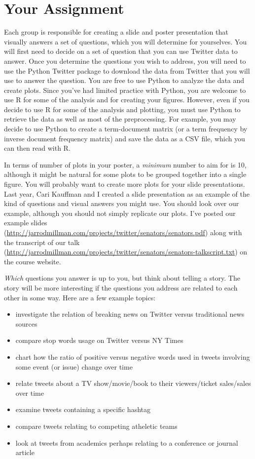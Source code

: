 \documentclass[11pt, oneside]{article}   	%
\begin{document}
\section{Your Assignment}

Each group is responsible for creating a slide and poster presentation that
visually answers a set of questions, which you will determine for yourselves.
You will first need to decide on a set of question that you can use Twitter
data to answer.  Once you determine the questions you wish to address, you will
need to use the Python Twitter package to download the data from Twitter that
you will use to answer the question.  You are free to use Python to analyze the
data and create plots.  Since you've had limited practice with Python, you are
welcome to use R for some of the analysis and for creating your figures.
However, even if you decide to use R for some of the analysis and plotting, you
must use Python to retrieve the data as well as most of the preprocessing.  For
example, you may decide to use Python to create a term-document matrix (or a
term frequency by inverse document frequency matrix) and save the data as a CSV
file, which you can then read with R.

In terms of number of plots in your poster, a {\em minimum} number to aim for
is 10, although it might be natural for some plots to be grouped together into
a single figure.  You will probably want to create more plots for your slide
presentations.  Last year, Cari Kauffman and I created a slide presentation as
an example of the kind of questions and visual answers you might use.  You
should look over our example, although you should not simply replicate our
plots.  I've posted our example slides
(\url{http://jarrodmillman.com/projects/twitter/senators/senators.pdf}) along
with the transcript of our talk
(\url{http://jarrodmillman.com/projects/twitter/senators/senators-talkscript.txt})
on the course website.

{\em Which} questions you answer is up to you, but think about telling a story.
The story will be more interesting if the questions you address are related to
each other in some way.  Here are a few example topics:

\begin{itemize}
\item investigate the relation of breaking news on Twitter versus traditional
      news sources
\item compare stop words usage on Twitter versus NY Times
\item chart how the ratio of positive versus negative words used in tweets
      involving some event (or issue) change over time
\item relate tweets about a TV show/movie/book to their viewers/ticket
      sales/sales over time
\item examine tweets containing a specific hashtag
\item compare tweets relating to competing atheletic teams
\item look at tweets from academics perhaps relating to a conference
      or journal article
\end{itemize}
\end{document}

